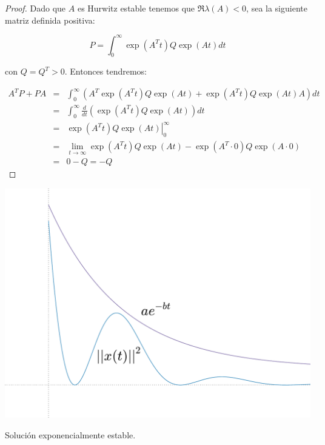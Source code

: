 \begin{proof}
            Dado que $A$ es Hurwitz estable tenemos que $\Re{\lambda(A)} < 0$, sea la siguiente matriz definida positiva:

            \begin{equation*}
                P = \int_0^{\infty} \exp{(A^Tt)} Q \exp(At) dt
            \end{equation*}

            con $Q = Q^T > 0$. Entonces tendremos:

            \begin{eqnarray*}
                A^T P + P A & = & \int_0^{\infty} \left( A^T \exp{(A^T t)} Q \exp{(At)} + \exp{(A^T t)} Q \exp{(At)} A \right) dt \\
                & = & \int_0^{\infty} \frac{d}{dt} \left( \exp{(A^T t)} Q \exp{(At)} \right) dt \\
                & = & \left. \exp{(A^T t)} Q \exp{(At)} \right|_0^{\infty} \\
                & = & \lim_{t \to \infty} \exp{(A^T t)} Q \exp{(At)} - \exp{(A^T \cdot 0)} Q \exp{(A \cdot 0)} \\
                & = & 0 - Q = - Q
            \end{eqnarray*}
        \end{proof}

        \begin{marginfigure}
            \centering
            \includegraphics[width=\textwidth]{./imagenes/trayectoria.pdf}
            \caption{\label{fig:trayectoria}Solución exponencialmente estable.}
        \end{marginfigure}

